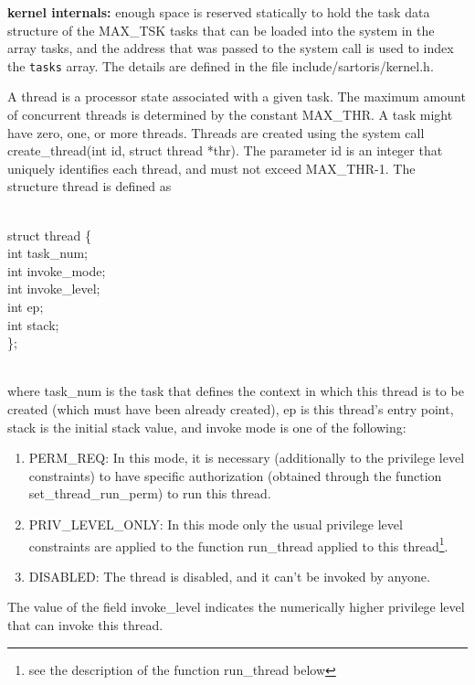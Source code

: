 \documentclass[11pt, letterpaper, twoside, english]{book}
\begin{document}
\textbf{kernel internals:} enough space is reserved statically to hold the \textsf{task} data structure of the \textsf{MAX\_TSK} tasks that can be loaded into the system in the array \textsf{tasks}, and the \textsf{address} that was passed to the system call is used to index the \verb|tasks| array. The details are defined in the file \textsf{include/sartoris/kernel.h}.

A thread is a processor state associated with a given task. The maximum amount of concurrent threads is determined by the constant \textsf{MAX\_THR}. A task might have zero, one, or more threads. Threads are created using the system call \textsf{create\_thread(int id, struct thread *thr)}. The parameter \textsf{id} is an integer that uniquely identifies each thread, and must not exceed \textsf{MAX\_THR}-1. The structure \textsf{thread} is defined as \\
\\
\begin{sf} \noindent struct thread \{ \\
\indent  int task\_num; \\
\indent  int invoke\_mode; \\
\indent  int invoke\_level; \\
\indent  int ep; \\
\indent  int stack; \\
\}; \\
\end{sf}
\\
where \textsf{task\_num} is the task that defines the context in which this thread is to be created (which must have been already created), \textsf{ep} is this thread's entry point, \textsf{stack} is the initial stack value, and invoke mode is one of the following:
\begin{enumerate}
\item[] \textsf{PERM\_REQ}: In this mode, it is necessary (additionally to the privilege level constraints) to have specific authorization (obtained through the function \textsf{set\_thread\_run\_perm}) to run this thread.
\item[] \textsf{PRIV\_LEVEL\_ONLY}: In this mode only the usual privilege level constraints are applied to the function \textsf{run\_thread} applied to this thread\footnote{see the description of the function \textsf{run\_thread} below}.
\item[] \textsf{DISABLED}: The thread is disabled, and it can't be invoked by anyone.
\end{enumerate}
The value of the field \textsf{invoke\_level} indicates the numerically higher privilege level that can invoke this thread. 
\end{document}
